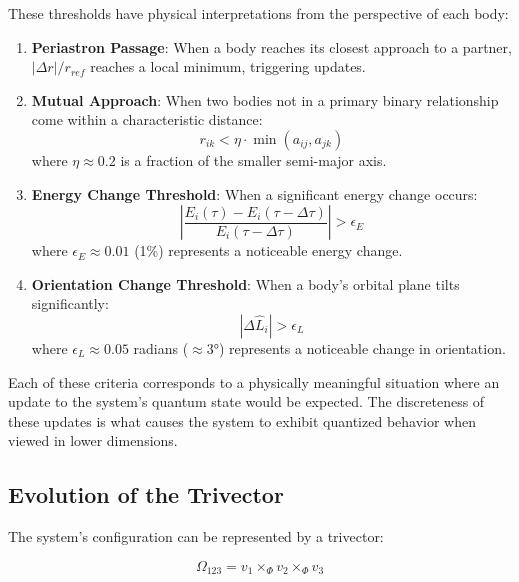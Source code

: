 \documentclass{article}
\begin{document}
These thresholds have physical interpretations from the perspective of each body:

\begin{enumerate}
\item \textbf{Periastron Passage}: When a body reaches its closest approach to a partner, $|\Delta r|/r_{ref}$ reaches a local minimum, triggering updates.

\item \textbf{Mutual Approach}: When two bodies not in a primary binary relationship come within a characteristic distance:
\begin{equation}
r_{ik} < \eta \cdot \min(a_{ij}, a_{jk})
\end{equation}
where $\eta \approx 0.2$ is a fraction of the smaller semi-major axis.

\item \textbf{Energy Change Threshold}: When a significant energy change occurs:
\begin{equation}
\left|\frac{E_i(\tau) - E_i(\tau-\Delta\tau)}{E_i(\tau-\Delta\tau)}\right| > \epsilon_E
\end{equation}
where $\epsilon_E \approx 0.01$ (1\%) represents a noticeable energy change.

\item \textbf{Orientation Change Threshold}: When a body's orbital plane tilts significantly:
\begin{equation}
|\Delta\hat{L}_i| > \epsilon_L
\end{equation}
where $\epsilon_L \approx 0.05$ radians ($\approx 3°$) represents a noticeable change in orientation.
\end{enumerate}

Each of these criteria corresponds to a physically meaningful situation where an update to the system's quantum state would be expected. The discreteness of these updates is what causes the system to exhibit quantized behavior when viewed in lower dimensions.

\subsection{Evolution of the Trivector}

The system's configuration can be represented by a trivector:

\begin{equation}
\Omega_{123} = v_1 \times_\Phi v_2 \times_\Phi v_3
\end{equation}
\end{document}
